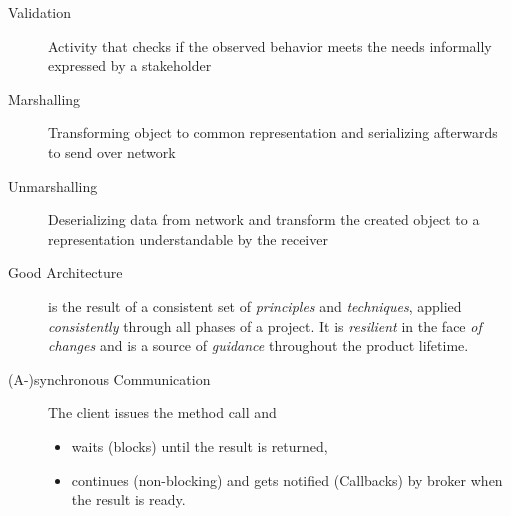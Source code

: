 \begin{description}
  \item[Validation] Activity that checks if the observed behavior meets the needs informally expressed by a stakeholder
  
  \item[Marshalling] Transforming object to common representation and serializing afterwards to send over network
  
  \item[Unmarshalling] Deserializing data from network and transform the created object to a representation understandable by the receiver
  
  \item[Good Architecture] is the result of a consistent set of \textit{principles} and \textit{techniques}, applied \textit{consistently} through all phases of a project. It is \textit{resilient} in the face \textit{of changes} and is a source of \textit{guidance} throughout the product lifetime.
  
  \item[(A-)synchronous Communication] The client issues the method call and
  \begin{itemize}[topsep=0pt, itemsep=0pt]
  	\item waits (blocks) until the result is returned,
  	\item continues (non-blocking) and gets notified (Callbacks) by broker when the result is ready.
  \end{itemize}
  
  
\end{description}
